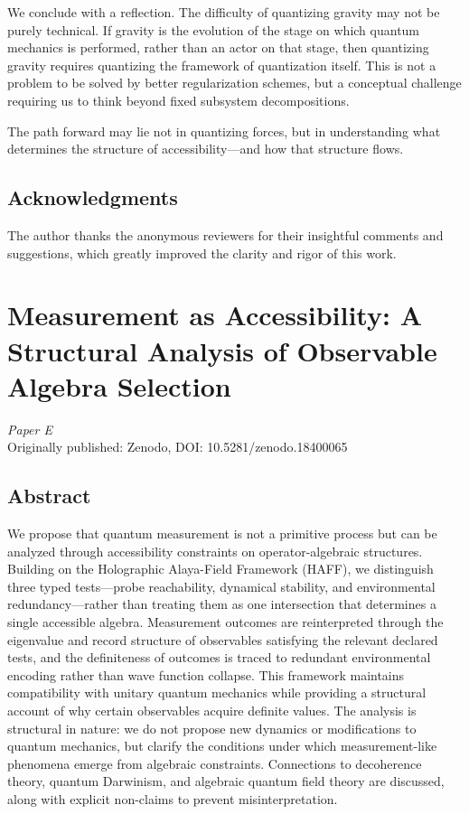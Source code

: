 \documentclass[12pt,a4paper,openany]{book}
\begin{document}
We conclude with a reflection. The difficulty of quantizing gravity may not be purely technical. If gravity is the evolution of the stage on which quantum mechanics is performed, rather than an actor on that stage, then quantizing gravity requires quantizing the framework of quantization itself. This is not a problem to be solved by better regularization schemes, but a conceptual challenge requiring us to think beyond fixed subsystem decompositions.

The path forward may lie not in quantizing forces, but in understanding what determines the structure of accessibility—and how that structure flows.

\section*{Acknowledgments}

The author thanks the anonymous reviewers for their insightful comments and suggestions, which greatly improved the clarity and rigor of this work.

\chapter{Measurement as Accessibility: A Structural Analysis of Observable Algebra Selection}
\label{H-chap:paperE}

\begin{center}
\textit{Paper E}\\[0.5em]
Originally published: Zenodo, DOI: 10.5281/zenodo.18400065
\end{center}

\bigskip

\section*{Abstract}
We propose that quantum measurement is not a primitive process but can be analyzed through accessibility constraints on operator-algebraic structures. Building on the Holographic Alaya-Field Framework (HAFF), we distinguish three typed tests---probe reachability, dynamical stability, and environmental redundancy---rather than treating them as one intersection that determines a single accessible algebra. Measurement outcomes are reinterpreted through the eigenvalue and record structure of observables satisfying the relevant declared tests, and the definiteness of outcomes is traced to redundant environmental encoding rather than wave function collapse. This framework maintains compatibility with unitary quantum mechanics while providing a structural account of why certain observables acquire definite values. The analysis is structural in nature: we do not propose new dynamics or modifications to quantum mechanics, but clarify the conditions under which measurement-like phenomena emerge from algebraic constraints. Connections to decoherence theory, quantum Darwinism, and algebraic quantum field theory are discussed, along with explicit non-claims to prevent misinterpretation.
\end{document}
